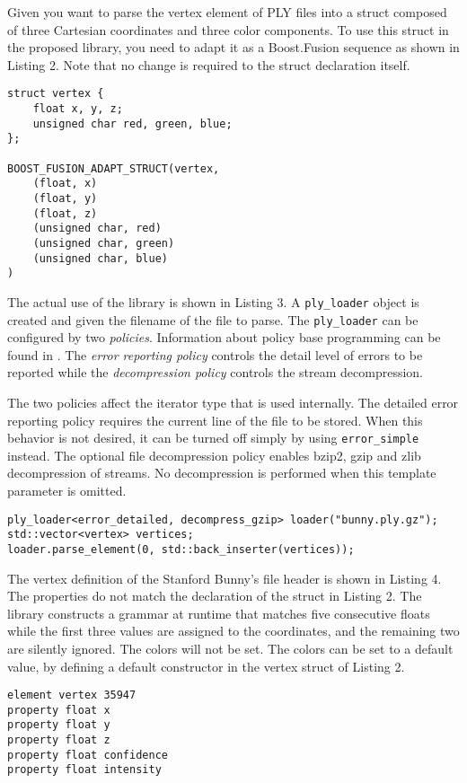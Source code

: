 Given you want to parse the vertex element of PLY files into a struct composed
of three Cartesian coordinates and three color components. To use this struct in
the proposed library, you need to adapt it as a Boost.Fusion sequence as shown
in Listing 2. Note that no change is required to the struct declaration itself.

\begin{lstlisting}[frame=tb,caption=Adapting a vertex struct]
struct vertex {
	float x, y, z;
	unsigned char red, green, blue;
};

BOOST_FUSION_ADAPT_STRUCT(vertex,
	(float, x)
	(float, y)
	(float, z)
	(unsigned char, red)
	(unsigned char, green)
	(unsigned char, blue)
)
\end{lstlisting}

The actual use of the library is shown in Listing 3. A \texttt{ply\_loader}
object is created and given the filename of the file to parse. The
\texttt{ply\_loader} can be configured by two \emph{policies}. Information about
policy base programming can be found in \cite{Alexandrescu:2001:MCD:377789}. The
\emph{error reporting policy} controls the detail level of errors to be reported
while the \emph{decompression policy} controls the stream decompression.

The two policies affect the iterator type that is used internally. The detailed
error reporting policy requires the current line of the file to be stored. When
this behavior is not desired, it can be turned off simply by using
\texttt{error\_simple} instead. The optional file decompression policy enables
bzip2, gzip and zlib decompression of streams. No decompression is performed
when this template parameter is omitted.

\begin{lstlisting}[float=*, frame=tb, caption=Example use of the library]
ply_loader<error_detailed, decompress_gzip> loader("bunny.ply.gz");
std::vector<vertex> vertices;
loader.parse_element(0, std::back_inserter(vertices));
\end{lstlisting}

The vertex definition of the Stanford Bunny's file header is shown in Listing
4. The properties do not match the declaration of the struct in Listing 2. The
library constructs a grammar at runtime that matches five consecutive floats
while the first three values are assigned to the coordinates, and the remaining
two are silently ignored. The colors will not be set. The colors can be set to a
default value, by defining a default constructor in the vertex struct of Listing
2.

\begin{lstlisting}[frame=tb,
  caption=Stanford Bunny's definition of the vertex element]
element vertex 35947
property float x
property float y
property float z
property float confidence
property float intensity
\end{lstlisting}

